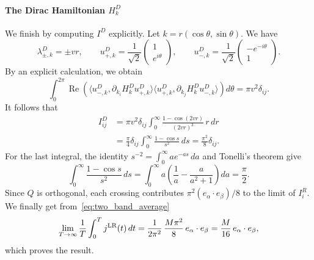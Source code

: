 \documentclass[a4paper,11pt]{article}
\theoremstyle{plain}
\theoremstyle{remark}
\def\1{{\mathds 1}}
\begin{document}
\paragraph{The Dirac Hamiltonian $H_k^D$}
We finish by computing $I^D$ explicitly. Let
$k=r(\cos\theta,\sin\theta)$. We have
\[
\lambda^D_{\pm,k}=\pm vr,\qquad
u^D_{+,k}=\frac1{\sqrt2}\begin{pmatrix}1\\e^{i\theta}\end{pmatrix},
\qquad
u^D_{-,k}=\frac1{\sqrt2}\begin{pmatrix}-e^{-i\theta}\\1\end{pmatrix}.
\]
By an explicit calculation, we obtain
\[
\int_0^{2\pi}\operatorname{Re}\left(
\langle u^D_{-,k},\partial_{k_i}H_k^D u^D_{+,k}\rangle
\langle u^D_{+,k},\partial_{k_j}H_k^D u^D_{-,k}\rangle\right)d\theta
=\pi v^2\delta_{ij}.
\]
It follows that
\begin{align*}
I_{ij}^D
&=\pi v^2\delta_{ij}\int_0^\infty
\frac{1-\cos(2vr)}{(2vr)^3}\,r\,dr\\
&=\frac\pi4\delta_{ij}\int_0^\infty\frac{1-\cos s}{s^2}\,ds
=\frac{\pi^2}{8}\delta_{ij}.
\end{align*}
For the last integral, the identity
$s^{-2}=\int_0^\infty a e^{-as}\,da$ and Tonelli's theorem give
\[
\int_0^\infty\frac{1-\cos s}{s^2}\,ds
=\int_0^\infty a\left(\frac1a-\frac{a}{a^2+1}\right)da
=\frac\pi2.
\]
Since $Q$ is orthogonal, each crossing contributes
$\pi^2(e_\alpha\cdot e_\beta)/8$ to the limit of $I_i^R$.
We finally get from~\eqref{eq:two_band_average}
\[
\lim_{T\to\infty}\frac1T\int_0^T j^{\rm LR}(t)\,dt
=\frac1{2\pi^2}\,\frac{M\pi^2}{8}\,e_\alpha\cdot e_\beta
=\frac{M}{16}\,e_\alpha\cdot e_\beta,
\]
which proves the result.




\end{document}

